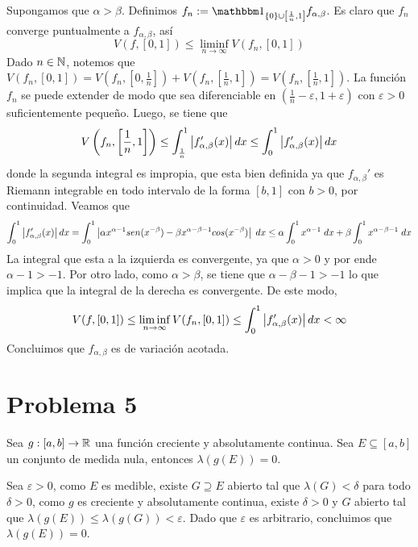 \documentclass{article}
\begin{document}
\vspace{2mm}
\noindent Supongamos que $\alpha>\beta$. Definimos $f_{n}:=\I_{\{0\}\cup\left[\frac{1}{n},1\right]}
f_{\alpha,\beta}$. Es claro que $f_{n}$ converge puntualmente a $f_{\alpha,\beta}$, así
\begin{equation*}
    V(f,[0,1])\leq\liminf\limits_{n\to\infty}V(f_{n},[0,1])
\end{equation*}
Dado $n\in\mathbb{N}$, notemos que $V(f_{n},[0,1])=V(f_{n},\left[0,\frac{1}{n}\right])
+V(f_{n},\left[\frac{1}{n},1\right])=V(f_{n},\left[\frac{1}{n},1\right])$. La función $f_{n}$ se 
puede extender de modo que sea diferenciable en $(\frac{1}{n}-\varepsilon,1+\varepsilon)$ con 
$\varepsilon>0$ suficientemente pequeño. Luego, se tiene que
\begin{equation*}
    V\left(f_{n},\left[\frac{1}{n},1\right]\right)\leq\int_{\frac{1}{n}}^{1}
    \left|f_{\alpha,\beta}'(x) \right|dx\leq\int_{0}^{1}\left|f_{\alpha,\beta}'(x) \right|dx
\end{equation*}
donde la segunda integral es impropia, que esta bien definida ya que $f_{\alpha,\beta}'$ es 
Riemann integrable en todo intervalo de la forma $[b,1]$ con $b>0$, por continuidad. Veamos que
\begin{equation*}
    \int_{0}^{1}\left|f_{\alpha,\beta}'(x) \right|dx=\int_{0}^{1}\left|\alpha x^{\alpha-1}sen(x^{-\beta})
    -\beta x^{\alpha-\beta-1}cos(x^{-\beta}) \right|\hspace{1mm}dx\leq\alpha\int_{0}^{1}x^{\alpha-1}
    \hspace{1mm}dx+\beta\int_{0}^{1}x^{\alpha-\beta-1}\hspace{1mm}dx
\end{equation*}
La integral que esta a la izquierda es convergente, ya que $\alpha>0$ y por ende $\alpha-1>-1$. Por 
otro lado, como $\alpha>\beta$, se tiene que $\alpha-\beta-1>-1$ lo que implica que la integral de 
la derecha es convergente. De este modo,
\begin{equation*}
    V(f,[0,1])\leq\liminf\limits_{n\to\infty}V(f_{n},[0,1])\leq
    \int_{0}^{1}\left|f_{\alpha,\beta}'(x) \right|dx<\infty
\end{equation*}
Concluimos que $f_{\alpha,\beta}$ es de variación acotada.

\section*{Problema 5}
\begin{lema}
    Sea $g:[a,b]\to\mathbb{R}$ una función creciente y absolutamente continua. Sea $E\subseteq[a,b]$ un
    conjunto de medida nula, entonces $\lambda(g(E))=0$.
\end{lema}
\begin{dem}
    Sea $\varepsilon>0$, como $E$ es medible, existe $G\supseteq E$ abierto tal que 
    $\lambda(G)<\delta$ para todo $\delta>0$, como $g$ es creciente y absolutamente continua, 
    existe $\delta>0$ y $G$ abierto tal que $\lambda(g(E))\leq\lambda(g(G))<\varepsilon$. Dado que
    $\varepsilon$ es arbitrario, concluimos que $\lambda(g(E))=0$.
\end{dem}
\end{document}
